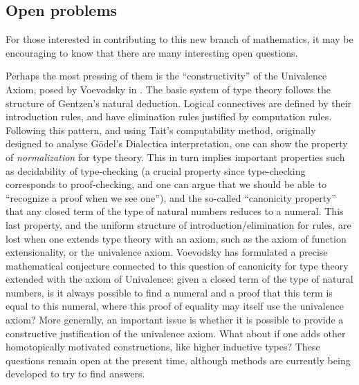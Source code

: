 %

\subsection*{Open problems} 

%

For those interested in contributing to this new branch of mathematics, it may be encouraging to know that there are many interesting open questions.

%
Perhaps the most pressing of them is the ``constructivity'' of the Univalence Axiom, posed by Voevodsky in \cite{Universe-poly}.
The basic system of type theory follows the structure of Gentzen's natural deduction. Logical connectives are defined by their introduction rules, and have elimination rules justified by computation rules. Following this pattern, and using Tait's computability method, originally designed to analyse G\"odel's Dialectica interpretation, one can show the property of \emph{normalization} for type theory. This in turn implies important properties such as decidability of type-checking (a crucial property since type-checking corresponds to proof-checking, and one can argue that we should be able to ``recognize a proof when we see one''), and the so-called ``canonicity property'' that any closed term of the type of natural numbers reduces to a numeral. This last property, and the uniform structure of introduction/elimination for rules, are lost when one extends type theory with an axiom, such as the axiom of function extensionality, or the univalence axiom. Voevodsky has formulated a precise mathematical conjecture connected to this question of canonicity for type theory extended with the axiom of Univalence: given a closed term of the type of natural numbers, is it always possible to find a numeral and a proof that this term is equal to this numeral, where this proof of equality may itself use the univalence axiom? More generally, an important issue is whether it is possible to provide a constructive justification of the univalence axiom.
What about if one adds other homotopically motivated constructions, like higher inductive types?
These questions remain open at the present time, although methods are currently being developed to try to find answers.

